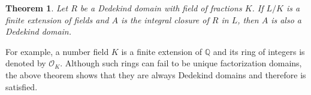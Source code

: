 \documentclass[12pt]{article}
\newtheorem*{theorem*}{Theorem}
\begin{document}
\begin{theorem*}
Let $R$ be a Dedekind domain with field of fractions $K$. If $L/K$ is a finite extension of fields and $A$ is the integral closure of $R$ in $L$, then $A$ is also a Dedekind domain.
\end{theorem*}

For example, a number field $K$ is a finite extension of $\mathbb{Q}$ and its ring of integers is denoted by $\mathcal{O}_K$. Although such rings can fail to be unique factorization domains, the above theorem shows that they are always Dedekind domains and therefore  is satisfied.

\end{document}
